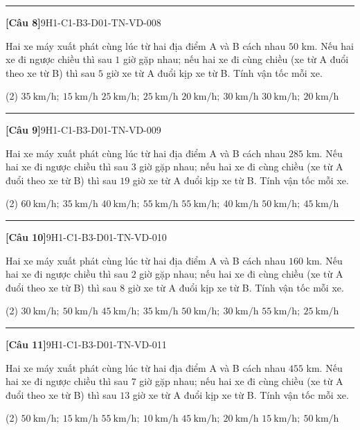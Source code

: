 \documentclass[12pt,a4paper]{article}
\newif\ifloigiai
\newenvironment{cauhoi}[2]{%
  \par\medskip\noindent\rule{\textwidth}{0.4pt}\par\nopagebreak
  \noindent\textbf{[#1]}\hfill{\scriptsize\ttfamily #2}\par\nopagebreak\smallskip}{\par}
\newcommand{\dapan}[1]{\ifloigiai\par\smallskip\noindent\textit{Đáp án:} \textbf{#1}\par\fi}
\begin{document}
\begin{cauhoi}{Câu 8}{9H1-C1-B3-D01-TN-VD-008}
Hai xe máy xuất phát cùng lúc từ hai địa điểm A và B cách nhau $50$ km. Nếu hai xe đi ngược chiều thì sau $1$ giờ gặp nhau; nếu hai xe đi cùng chiều (xe từ A đuổi theo xe từ B) thì sau $5$ giờ xe từ A đuổi kịp xe từ B. Tính vận tốc mỗi xe.
\begin{tasks}(2)
\task $35\ \text{km/h};\ 15\ \text{km/h}$
\task $25\ \text{km/h};\ 25\ \text{km/h}$
\task $20\ \text{km/h};\ 30\ \text{km/h}$
\task $30\ \text{km/h};\ 20\ \text{km/h}$
\end{tasks}
\dapan{D}
\end{cauhoi}
\begin{cauhoi}{Câu 9}{9H1-C1-B3-D01-TN-VD-009}
Hai xe máy xuất phát cùng lúc từ hai địa điểm A và B cách nhau $285$ km. Nếu hai xe đi ngược chiều thì sau $3$ giờ gặp nhau; nếu hai xe đi cùng chiều (xe từ A đuổi theo xe từ B) thì sau $19$ giờ xe từ A đuổi kịp xe từ B. Tính vận tốc mỗi xe.
\begin{tasks}(2)
\task $60\ \text{km/h};\ 35\ \text{km/h}$
\task $40\ \text{km/h};\ 55\ \text{km/h}$
\task $55\ \text{km/h};\ 40\ \text{km/h}$
\task $50\ \text{km/h};\ 45\ \text{km/h}$
\end{tasks}
\dapan{C}
\end{cauhoi}
\begin{cauhoi}{Câu 10}{9H1-C1-B3-D01-TN-VD-010}
Hai xe máy xuất phát cùng lúc từ hai địa điểm A và B cách nhau $160$ km. Nếu hai xe đi ngược chiều thì sau $2$ giờ gặp nhau; nếu hai xe đi cùng chiều (xe từ A đuổi theo xe từ B) thì sau $8$ giờ xe từ A đuổi kịp xe từ B. Tính vận tốc mỗi xe.
\begin{tasks}(2)
\task $30\ \text{km/h};\ 50\ \text{km/h}$
\task $45\ \text{km/h};\ 35\ \text{km/h}$
\task $50\ \text{km/h};\ 30\ \text{km/h}$
\task $55\ \text{km/h};\ 25\ \text{km/h}$
\end{tasks}
\dapan{C}
\end{cauhoi}
\begin{cauhoi}{Câu 11}{9H1-C1-B3-D01-TN-VD-011}
Hai xe máy xuất phát cùng lúc từ hai địa điểm A và B cách nhau $455$ km. Nếu hai xe đi ngược chiều thì sau $7$ giờ gặp nhau; nếu hai xe đi cùng chiều (xe từ A đuổi theo xe từ B) thì sau $13$ giờ xe từ A đuổi kịp xe từ B. Tính vận tốc mỗi xe.
\begin{tasks}(2)
\task $50\ \text{km/h};\ 15\ \text{km/h}$
\task $55\ \text{km/h};\ 10\ \text{km/h}$
\task $45\ \text{km/h};\ 20\ \text{km/h}$
\task $15\ \text{km/h};\ 50\ \text{km/h}$
\end{tasks}
\dapan{A}
\end{cauhoi}
\end{document}
